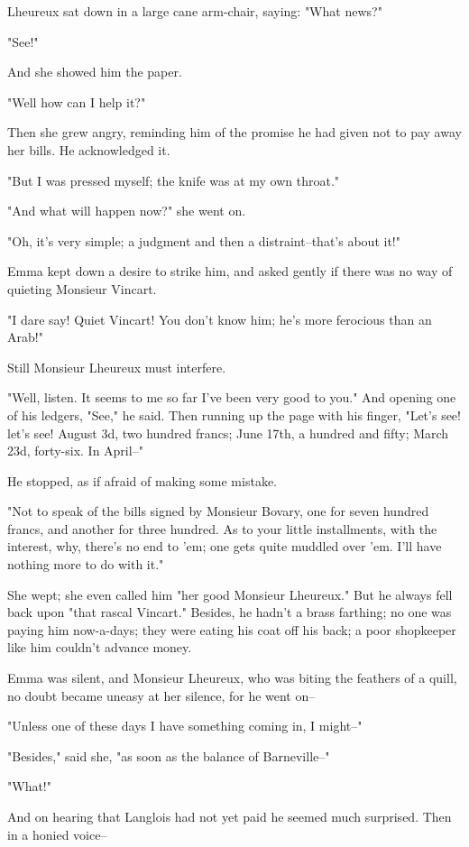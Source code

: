 \documentclass{tufte-book}
\begin{document}
Lheureux sat down in a large cane arm-chair, saying: "What news?"

"See!"

And she showed him the paper.

"Well how can I help it?"

Then she grew angry, reminding him of the promise he had given not to
pay away her bills. He acknowledged it.

"But I was pressed myself; the knife was at my own throat."

"And what will happen now?" she went on.

"Oh, it's very simple; a judgment and then a distraint--that's about
it!"

Emma kept down a desire to strike him, and asked gently if there was no
way of quieting Monsieur Vincart.

"I dare say! Quiet Vincart! You don't know him; he's more ferocious than
an Arab!"

Still Monsieur Lheureux must interfere.

"Well, listen. It seems to me so far I've been very good to you." And
opening one of his ledgers, "See," he said. Then running up the page
with his finger, "Let's see! let's see! August 3d, two hundred francs;
June 17th, a hundred and fifty; March 23d, forty-six. In April--"

He stopped, as if afraid of making some mistake.

"Not to speak of the bills signed by Monsieur Bovary, one for seven
hundred francs, and another for three hundred. As to your little
installments, with the interest, why, there's no end to 'em; one gets
quite muddled over 'em. I'll have nothing more to do with it."

She wept; she even called him "her good Monsieur Lheureux." But he
always fell back upon "that rascal Vincart." Besides, he hadn't a brass
farthing; no one was paying him now-a-days; they were eating his coat
off his back; a poor shopkeeper like him couldn't advance money.

Emma was silent, and Monsieur Lheureux, who was biting the feathers of a
quill, no doubt became uneasy at her silence, for he went on--

"Unless one of these days I have something coming in, I might--"

"Besides," said she, "as soon as the balance of Barneville--"

"What!"

And on hearing that Langlois had not yet paid he seemed much surprised.
Then in a honied voice--
\end{document}
